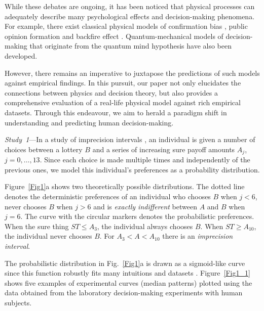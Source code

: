 \documentclass[aps,prl,reprint,superscriptaddress]{revtex4-2}
\begin{document}
While these debates are ongoing, it has been noticed that physical processes can adequately describe many psychological effects and decision-making phenomena. For example, there exist classical physical models of confirmation bias \cite{Gro17}, public opinion formation \cite{Gal05, Cas09, Red19} and backfire effect \cite{Hoh23}. Quantum-mechanical models of decision-making \cite{Atm10, Aer14, Bus12} that originate from the quantum mind hypothesis \cite{Khr06, mindell2012quantum} have also been developed.

However, there remains an imperative to juxtapose the predictions of such models against empirical findings. In this pursuit, our paper not only elucidates the connections between physics and decision theory, but also provides a comprehensive evaluation of a real-life physical model against rich empirical datasets. Through this endeavour, we aim to herald a paradigm shift in understanding and predicting human decision-making.   

{\it Study~1}---In a study of imprecision intervals \cite{mosteller1951experimental, loomes2014testing, loomes2017preference}, an individual is given a number of choices between a lottery $B$ and a series of increasing sure payoff amounts $A_j$,~$j=0,\dots,13$. Since each choice is made multiple times and independently of the previous ones, we model this individual’s preferences as a probability distribution. 

Figure~\ref{Fig1}a shows two theoretically possible distributions. The dotted line denotes the deterministic preferences of an individual who chooses $B$ when $j<6$, never chooses $B$ when $j>6$ and is \textit{exactly indifferent} between $A$ and $B$ when $j=6$. The curve with the circular markers denotes the probabilistic preferences. When the sure thing $ST\leq A_3$, the individual always chooses $B$. When $ST\geq A_{10}$, the individual never chooses $B$. For $A_3<A<A_{10}$ there is an \textit{imprecision interval}.

The probabilistic distribution in Fig.~\ref{Fig1}a is drawn as a sigmoid-like curve since this function robustly fits many intuitions \cite{loomes2017preference} and datasets \cite{mosteller1951experimental, loomes2014testing, loomes2017preference, blavatskyy2010models, butler2018predictably}. Figure~\ref{Fig1_1} shows five examples of experimental curves (median patterns) plotted using the data obtained from the laboratory decision-making experiments with human subjects.
\end{document}
